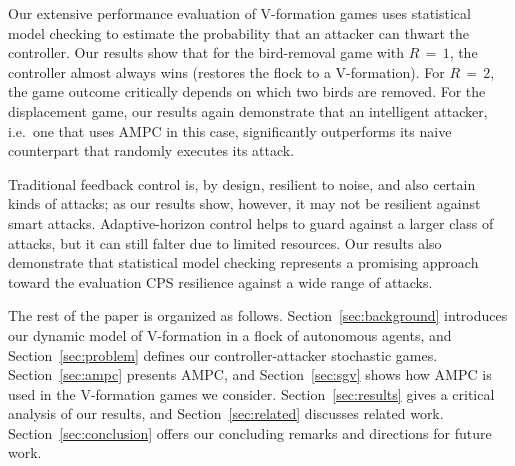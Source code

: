 Our extensive performance evaluation of V-formation games uses statistical model checking to estimate the probability that an attacker can thwart the controller.  Our results show that for the bird-removal game with $R\,{=}\,1$, the controller almost always wins (restores the flock to a V-formation). For $R\,{=}\,2$, the game outcome critically depends on which two birds are removed.
For the displacement game, our results again demonstrate that an intelligent attacker, i.e.~one that uses AMPC in this case, significantly outperforms its naive counterpart
that randomly executes its attack.

Traditional feedback control is, by design, resilient to noise, and also certain kinds of attacks; as our results show, however, it may not be resilient against smart attacks.  Adaptive-horizon control helps to guard against a larger class of attacks, but it can still falter due to limited resources.
Our results also demonstrate that statistical model checking represents a promising approach toward the evaluation CPS resilience against a wide range of attacks.

The rest of the paper is organized as follows.  Section~\ref{sec:background} introduces our dynamic model of V-formation in a flock of autonomous agents, and Section~\ref{sec:problem} defines our controller-attacker stochastic games. Section~\ref{sec:ampc} presents AMPC, and Section~\ref{sec:sgv} shows how AMPC is used in the V-formation games we consider. Section~\ref{sec:results} gives a critical analysis of our results, and Section~\ref{sec:related} discusses related work. Section~\ref{sec:conclusion} offers our concluding remarks and directions for future work.

 

